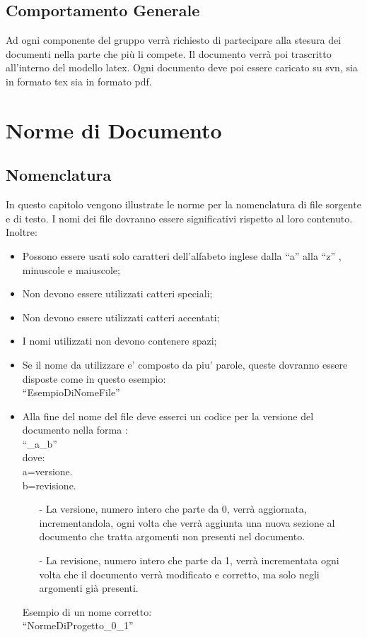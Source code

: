 \documentclass[11pt,titlepage,a4paper]{report}
\begin{document}
\section{Comportamento Generale}
Ad ogni componente del gruppo verr\`a richiesto di partecipare alla stesura dei documenti nella parte che pi\`u li compete. Il documento verr\`a poi trascritto all'interno del modello latex. Ogni documento deve poi essere caricato  su svn, sia in formato tex sia in formato pdf.

\chapter{Norme di Documento}
\section{Nomenclatura}
In questo capitolo vengono illustrate le norme per la nomenclatura di file sorgente e di testo. I nomi dei file dovranno essere significativi rispetto al loro contenuto. Inoltre:
\begin{itemize}
\item Possono essere usati solo caratteri dell'alfabeto inglese dalla ``a'' alla ``z'' , minuscole e maiuscole;
\item Non devono essere utilizzati catteri speciali;
\item Non devono essere utilizzati catteri accentati;
\item I nomi utilizzati non devono contenere spazi;
\item Se il nome da utilizzare e' composto da piu' parole, queste dovranno essere disposte come in questo esempio: \\
``EsempioDiNomeFile''
\item Alla fine del nome del file deve esserci un codice per la versione del documento nella forma :\\ 
``\_a\_b'' \\
dove:\\
a=versione.\\
b=revisione.\\
\begin{itemize}
\item[-]La versione, numero intero che parte da 0, verr\`a aggiornata, incrementandola, ogni volta che verr\`a aggiunta una nuova sezione al documento che tratta argomenti non presenti nel documento.
\item[-]La revisione, numero intero che parte da 1, verr\`a incrementata ogni volta che il documento verr\`a modificato e corretto, ma solo negli argomenti gi\`a presenti.
\end{itemize} 
Esempio di un nome corretto:\\
``NormeDiProgetto\_0\_1''
\end{itemize}
\end{document}
